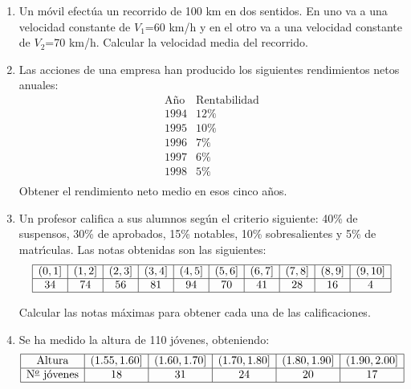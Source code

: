\documentclass[11pt]{book}
\begin{document}
\begin{enumerate}
 \item Un m{\'o}vil efect{\'u}a un recorrido de 100 km en dos sentidos. En
uno  va a
      una velocidad constante de $V_1$=60 km/h y en el otro va a una velocidad
      constante de $V_2$=70 km/h. Calcular la velocidad media del recorrido.
\vskip 0.3cm  \item Las acciones de una empresa han producido los  siguientes  rendimientos
      netos anuales:
$$
    \begin{array}{cc}
                  \mbox{A{\~n}o} & \mbox{Rentabilidad} \\ \hline
                        1994  &        12\%     \\
                        1995  &        10\%     \\
                        1996  &         7\%     \\
                        1997  &         6\%     \\
                        1998  &         5\%     \\
     \end{array}
$$
    Obtener el rendimiento neto medio en esos cinco a{\~n}os.
\newpage  \item Un profesor califica a sus alumnos seg{\'u}n el criterio siguiente: 40\%  de
      suspensos, 30\% de aprobados, 15\% notables, 10\% sobresalientes y  5\%  de
      matr{\'\i}culas. Las notas obtenidas son las si\-guien\-tes:
$$
\begin{array}{|c|c|c|c|c|c|c|c|c|c|} \hline
  (0,1] & (1,2] & (2,3] & (3,4] & (4,5] & (5,6] & (6,7] & (7,8] & (8,9] & (9,10] \\ \hline
   34 & 74  & 56  &  81 &  94 &  70 &  41 &  28 &  16 &  4  \\ \hline
\end{array}
$$

    Calcular las notas m{\'a}ximas para obtener cada una de las calificaciones.
\vskip 0.4cm  \item Se ha medido la altura de 110 j{\'o}venes, obteniendo:
$$
\begin{array}{|c|c|c|c|c|c|c|c|c|c|} \hline
\mbox{Altura}     & (1\mbox{.}55,1\mbox{.}60] &
(1\mbox{.}60,1\mbox{.}70] & (1\mbox{.}70,1\mbox{.}80] &
(1\mbox{.}80,1\mbox{.}90] & (1\mbox{.}90,2\mbox{.}00] \\ \hline
\mbox{N${}^{\underline{o}}$ j{\'o}venes} & 18 & 31     &  24       &
20    &  17  \\ \hline
\end{array}
$$


\end{enumerate}
\end{document}

